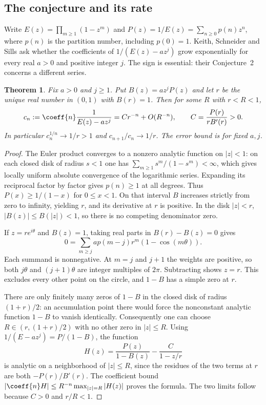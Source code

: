 \documentclass[11pt,a4paper]{article}
\numberwithin{equation}{section}
\newtheorem{theorem}{Theorem}[section]
\theoremstyle{definition}
\theoremstyle{remark}
\begin{document}
\subsection*{The conjecture and its rate}
Write $E(z)=\prod_{m\ge1}(1-z^m)$ and $P(z)=1/E(z)
=\sum_{n\ge0}p(n)z^n$, where $p(n)$ is the partition number,
including $p(0)=1$. Keith, Schneider and Sills \cite[p.~12,
Conjecture~1]{r26taisho:KSS} ask whether the coefficients of $1/(E(z)-az^j)$
grow exponentially for every real $a>0$ and positive integer $j$.
The sign is essential: their Conjecture~2 concerns a different series.
\begin{theorem}
Fix $a>0$ and $j\ge1$. Put $B(z)=az^jP(z)$ and let $r$ be the unique
real number in $(0,1)$ with $B(r)=1$. Then for some $R$ with $r<R<1$,
\[
 c_n:=\coeff{n}\frac{1}{E(z)-az^j}
 = C r^{-n}+O(R^{-n}),\qquad C=\frac{P(r)}{r B'(r)}>0 .
\]
In particular $c_n^{1/n}\to 1/r>1$ and $c_{n+1}/c_n\to 1/r$.
The error bound is for fixed $a,j$.
\end{theorem}
\begin{proof}
The Euler product converges to a nonzero analytic function on
$|z|<1$: on each closed disk of radius $s<1$ one has
$\sum_{m\ge1}s^m/(1-s^m)<\infty$, which gives locally uniform
absolute convergence of the logarithmic series. Expanding its reciprocal
factor by factor gives $p(n)\ge1$ at all degrees. Thus
$P(x)\ge 1/(1-x)$ for $0\le x<1$. On that interval $B$ increases strictly
from zero to infinity, yielding $r$, and its derivative at $r$ is positive.
In the disk $|z|<r$,
$|B(z)|\le B(|z|)<1$, so there is no competing denominator zero.

If $z=r e^{i\theta}$ and $B(z)=1$, taking real parts in
$B(r)-B(z)=0$ gives
\[
 0=\sum_{m\ge j} a p(m-j)r^m(1-\cos(m\theta)).
\]
Each summand is nonnegative. At $m=j$ and $j+1$ the weights are positive,
so both $j\theta$ and $(j+1)\theta$ are integer multiples of $2\pi$.
Subtracting shows $z=r$. This excludes every other point on the
circle, and $1-B$ has a simple zero at $r$.

There are only finitely many zeros of $1-B$ in the closed disk
of radius $(1+r)/2$: an accumulation point there would force the
nonconstant analytic function $1-B$ to vanish identically.
Consequently one can choose $R\in(r,(1+r)/2)$ with no other zero in
$|z|\le R$. Using $1/(E-az^j)=P/(1-B)$, the function
\[
 H(z)=\frac{P(z)}{1-B(z)}-\frac{C}{1-z/r}
\]
is analytic on a neighborhood of $|z|\le R$, since the residues of
the two terms at $r$ are both $-P(r)/B'(r)$. The coefficient bound
$|\coeff{n}H|\le R^{-n}\max_{|z|=R}|H(z)|$ proves the formula.
The two limits follow because $C>0$ and $r/R<1$.
\end{proof}
\end{document}
